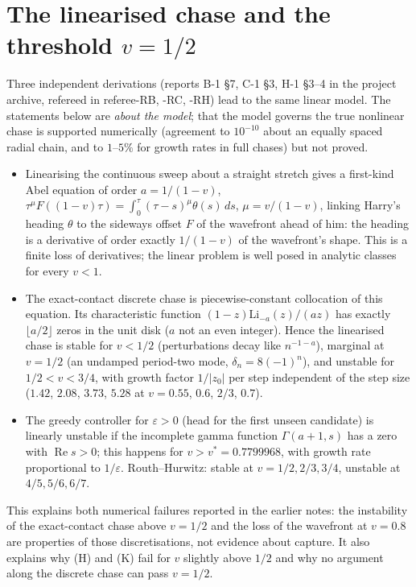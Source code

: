 \documentclass[11pt]{article}
\theoremstyle{remark}\newtheorem{remark}{Remark}
\begin{document}









\section{The linearised chase and the threshold $v=1/2$}\label{sec:linear}
Three independent derivations (reports B-1 \S7, C-1 \S3, H-1 \S3--4 in the project archive, refereed in referee-RB, -RC, -RH)
lead to the same linear model. The statements below are \emph{about the model}; that the model governs the true nonlinear chase
is supported numerically (agreement to $10^{-10}$ about an equally spaced radial chain, and to $1$--$5\%$ for growth rates in full
chases) but not proved.
\begin{itemize}
\item Linearising the continuous sweep about a straight stretch gives a first-kind Abel equation of order $a=1/(1-v)$,
$\tau^{\mu}F((1-v)\tau)=\int_0^\tau(\tau-s)^\mu\theta(s)\,ds$, $\mu=v/(1-v)$, linking Harry's heading $\theta$ to the sideways offset $F$
of the wavefront ahead of him: the heading is a derivative of order exactly $1/(1-v)$ of the wavefront's shape. This is a finite
loss of derivatives; the linear problem is well posed in analytic classes for every $v<1$.
\item The exact-contact discrete chase is piecewise-constant collocation of this equation. Its characteristic function
$(1-z)\mathrm{Li}_{-a}(z)/(az)$ has exactly $\lfloor a/2\rfloor$ zeros in the unit disk ($a$ not an even integer). Hence the
linearised chase is stable for $v<1/2$ (perturbations decay like $n^{-1-a}$), marginal at $v=1/2$ (an undamped period-two mode,
$\delta_n=8(-1)^n$), and unstable for $1/2<v<3/4$, with growth factor $1/|z_0|$ per step independent of the step size
($1.42$, $2.08$, $3.73$, $5.28$ at $v=0.55$, $0.6$, $2/3$, $0.7$).
\item The greedy controller for $\varepsilon>0$ (head for the first unseen candidate) is linearly unstable if the incomplete gamma
function $\Gamma(a+1,s)$ has a zero with $\operatorname{Re}s>0$; this happens for $v>v^*=0.7799968$, with growth rate proportional
to $1/\varepsilon$. Routh--Hurwitz: stable at $v=1/2,2/3,3/4$, unstable at $4/5,5/6,6/7$.
\end{itemize}
This explains both numerical failures reported in the earlier notes: the instability of the exact-contact chase above $v=1/2$ and
the loss of the wavefront at $v=0.8$ are properties of those discretisations, not evidence about capture. It also explains why
(H) and (K) fail for $v$ slightly above $1/2$ and why no argument along the discrete chase can pass $v=1/2$.
\end{document}
